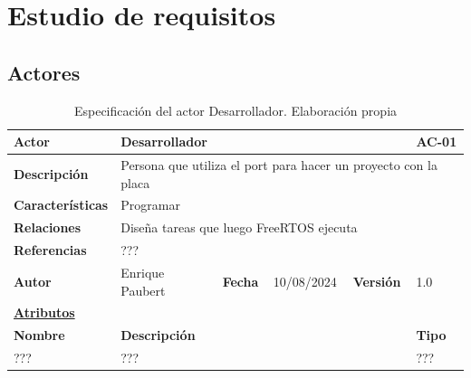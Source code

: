 \chapter{Estudio de requisitos}

\section{Actores}

\begin{table}[H]
    \begin{tabular}{|llllll|}
	\hline
	\multicolumn{1}{|l|}{\textbf{Actor}}		& \multicolumn{4}{l|}{Desarrollador}	& AC-01	    \\ \hline
	\multicolumn{1}{|l|}{\textbf{Descripción}}     	& \multicolumn{5}{l|}{Persona que utiliza el port para hacer un proyecto con la placa}	    \\ \hline
	\multicolumn{1}{|l|}{\textbf{Características}}	& \multicolumn{5}{l|}{Programar}	\\ \hline
	\multicolumn{1}{|l|}{\textbf{Relaciones}}		& \multicolumn{5}{l|}{Diseña tareas que luego FreeRTOS ejecuta}	    \\ \hline
	\multicolumn{1}{|l|}{\textbf{Referencias}}     	& \multicolumn{5}{l|}{???}	\\ \hline
	\multicolumn{1}{|l|}{\textbf{Autor}}           	& \multicolumn{1}{l|}{Enrique Paubert}        & \multicolumn{1}{l|}{\textbf{Fecha}}        & \multicolumn{1}{l|}{10/08/2024}        & \multicolumn{1}{l|}{\textbf{Versión}}       & 1.0                   \\ \hline
	\multicolumn{6}{|l|}{\textbf{\underline{Atributos}}} \\ \hline %
	\multicolumn{1}{|l|}{\textbf{Nombre}}		& \multicolumn{4}{l|}{\textbf{Descripción}} &  \textbf{Tipo}  \\ \hline
	\multicolumn{1}{|l|}{ ??? }				& \multicolumn{4}{l|}{ ??? }  &  ???      \\ \hline
    \end{tabular}
    \caption[Actor: Desarrollador]{Especificación del actor Desarrollador. Elaboración propia}
\end{table}

